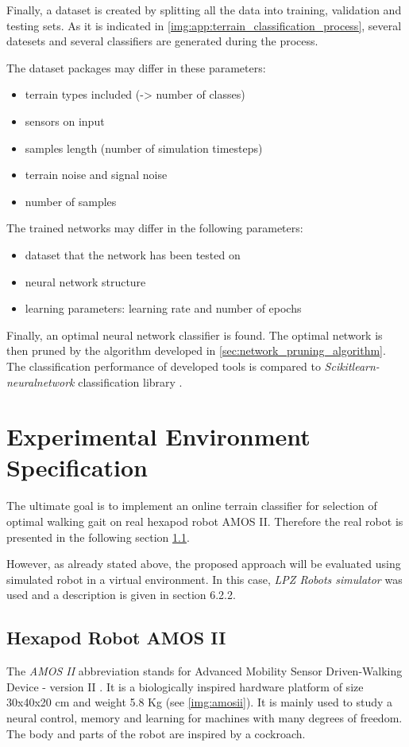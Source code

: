 Finally, a dataset is created by splitting all the data into training, validation and testing sets. As it is indicated in \cref{img:app:terrain_classification_process}, several datesets and several classifiers are generated during the process. 

The dataset packages may differ in these parameters:
\begin{itemize}
\item terrain types included (-> number of classes)
\item sensors on input
\item samples length (number of simulation timesteps)
\item terrain noise and signal noise
\item number of samples
\end{itemize}

The trained networks may differ in the following parameters:
\begin{itemize}
\item dataset that the network has been tested on
\item neural network structure
\item learning parameters: learning rate and number of epochs
\end{itemize}

Finally, an optimal neural network classifier is found. The optimal network is then pruned by the algorithm developed in \cref{sec:network_pruning_algorithm}. The classification performance of developed tools is compared to \textit{Scikitlearn-neuralnetwork} classification library \citep{misc:sknn}.

\section{Experimental Environment Specification}
The ultimate goal is to implement an online terrain classifier for selection of optimal walking gait on real hexapod robot AMOS II. Therefore the real robot is presented in the following section \ref{ssec:amosii}.

However, as already stated above, the proposed approach will be evaluated using simulated robot in a virtual environment. In this case, \textit{LPZ Robots simulator} \citep{misc:lpzrobots} was used and a description is given in section 6.2.2.

\subsection{Hexapod Robot AMOS II} \label{ssec:amosii}
The \textit{AMOS II} abbreviation stands for Advanced Mobility Sensor Driven-Walking Device - version II \citep{misc:amosii}. It is a biologically inspired hardware platform of size 30x40x20 cm and weight 5.8 Kg (see \cref{img:amosii}). It is mainly used to study a neural control, memory and learning for machines with many degrees of freedom. The body and parts of the robot are inspired by a cockroach.

